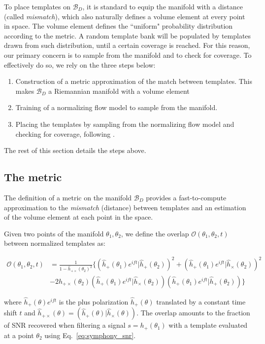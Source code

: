 \documentclass[twocolumn,showpacs,preprintnumbers,nofootinbib,prd,
superscriptaddress,10pt]{revtex4-2}
\newcommand{\rescalar}[2]{( #1 |#2 )}
\newcommand{\rescalarwide}[2]{\left( #1 \lvert #2 \right)}
\begin{document}
To place templates on $\mathcal{B}_D$, it is standard to equip the manifold with a distance (called {\it mismatch}), which also naturally defines a volume element at every point in space. The volume element defines the ``uniform" probability distribution according to the metric.
A random template bank will be populated by templates drawn from such distribution, until a certain coverage is reached. For this reason, our primary concern is to sample from the manifold and to check for coverage. To effectively do so, we rely on the three steps below:
\begin{enumerate}
	\item Construction of a metric approximation of the match between templates. This makes $\mathcal{B}_D$ a Riemannian manifold with a volume element
	\item Training of a normalizing flow model to sample from the manifold. 
	\item Placing the templates by sampling from the normalizing flow model and checking for coverage, following \cite{Coogan:2022qxs}.
\end{enumerate}
The rest of this section details the steps above.

\subsection{The metric} \label{sec:metric}

The definition of a metric on the manifold $\mathcal{B}_D$ provides a fast-to-compute approximation to the {\it mismatch} (distance) between templates and an estimation of the volume element at each point in the space.

Given two points of the manifold $\theta_1,\theta_2$, we define the overlap $\mathcal{O}(\theta_1,\theta_2, t)$ between normalized templates as:
\begin{widetext}
	\begin{align}\label{eq:overlap}
		\mathcal{O}(\theta_1,\theta_2, t) &= \frac{1}{1- \hat{h}_{+\times}(\theta_2)^2} 
		\biggl\{ \rescalarwide{\hat{h}_+(\theta_1)e^{i ft}}{\hat{h}_+(\theta_2)}^2 + \rescalarwide{\hat{h}_+(\theta_1)e^{i ft}}{\hat{h}_\times(\theta_2)}^2 \nonumber \\
		& -2h_{+\times}(\theta_2)\rescalarwide{\hat{h}_+(\theta_1)e^{i ft}}{\hat{h}_\times(\theta_2)}\rescalarwide{\hat{h}_+(\theta_1)e^{i ft}}{\hat{h}_+(\theta_2)} \biggl\}
	\end{align}
\end{widetext}
where $\hat{h}_+(\theta)e^{i ft}$ is the plus polarization $\hat{h}_+(\theta)$ translated by a constant time shift $t$ and $\hat{h}_{+\times}(\theta) = \rescalar{\hat{h}_+(\theta)}{\hat{h}_\times(\theta)}$.
The overlap amounts to the fraction of SNR recovered when filtering a signal $s=h_+(\theta_1)$ with a template evaluated at a point $\theta_2$ using Eq.~\eqref{eq:symphony_snr}.
\end{document}
